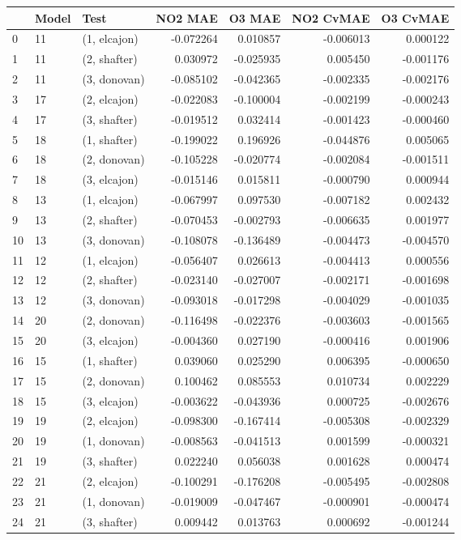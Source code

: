 \begin{tabular}{lllrrrr}
\toprule
{} & Model &          Test &   NO2 MAE &    O3 MAE &  NO2 CvMAE &  O3 CvMAE \\
\midrule
0  &    11 &  (1, elcajon) & -0.072264 &  0.010857 &  -0.006013 &  0.000122 \\
1  &    11 &  (2, shafter) &  0.030972 & -0.025935 &   0.005450 & -0.001176 \\
2  &    11 &  (3, donovan) & -0.085102 & -0.042365 &  -0.002335 & -0.002176 \\
3  &    17 &  (2, elcajon) & -0.022083 & -0.100004 &  -0.002199 & -0.000243 \\
4  &    17 &  (3, shafter) & -0.019512 &  0.032414 &  -0.001423 & -0.000460 \\
5  &    18 &  (1, shafter) & -0.199022 &  0.196926 &  -0.044876 &  0.005065 \\
6  &    18 &  (2, donovan) & -0.105228 & -0.020774 &  -0.002084 & -0.001511 \\
7  &    18 &  (3, elcajon) & -0.015146 &  0.015811 &  -0.000790 &  0.000944 \\
8  &    13 &  (1, elcajon) & -0.067997 &  0.097530 &  -0.007182 &  0.002432 \\
9  &    13 &  (2, shafter) & -0.070453 & -0.002793 &  -0.006635 &  0.001977 \\
10 &    13 &  (3, donovan) & -0.108078 & -0.136489 &  -0.004473 & -0.004570 \\
11 &    12 &  (1, elcajon) & -0.056407 &  0.026613 &  -0.004413 &  0.000556 \\
12 &    12 &  (2, shafter) & -0.023140 & -0.027007 &  -0.002171 & -0.001698 \\
13 &    12 &  (3, donovan) & -0.093018 & -0.017298 &  -0.004029 & -0.001035 \\
14 &    20 &  (2, donovan) & -0.116498 & -0.022376 &  -0.003603 & -0.001565 \\
15 &    20 &  (3, elcajon) & -0.004360 &  0.027190 &  -0.000416 &  0.001906 \\
16 &    15 &  (1, shafter) &  0.039060 &  0.025290 &   0.006395 & -0.000650 \\
17 &    15 &  (2, donovan) &  0.100462 &  0.085553 &   0.010734 &  0.002229 \\
18 &    15 &  (3, elcajon) & -0.003622 & -0.043936 &   0.000725 & -0.002676 \\
19 &    19 &  (2, elcajon) & -0.098300 & -0.167414 &  -0.005308 & -0.002329 \\
20 &    19 &  (1, donovan) & -0.008563 & -0.041513 &   0.001599 & -0.000321 \\
21 &    19 &  (3, shafter) &  0.022240 &  0.056038 &   0.001628 &  0.000474 \\
22 &    21 &  (2, elcajon) & -0.100291 & -0.176208 &  -0.005495 & -0.002808 \\
23 &    21 &  (1, donovan) & -0.019009 & -0.047467 &  -0.000901 & -0.000474 \\
24 &    21 &  (3, shafter) &  0.009442 &  0.013763 &   0.000692 & -0.001244 \\
\bottomrule
\end{tabular}

